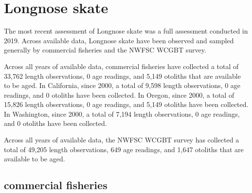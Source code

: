 \documentclass[11pt,
  english,
  letterpaper,
]{article}
\begin{document}

\hypertarget{longnose-skate}{%
\section{Longnose skate}\label{longnose-skate}}

\leavevmode\tagmcend\tagstructend


The most recent assessment of Longnose skate was a full assessment conducted in 2019. Across available data, Longnose skate have been observed and sampled generally by commercial fisheries and the NWFSC WCGBT survey.

\leavevmode\tagmcend\tagstructend\par


Across all years of available data, commercial fisheries have collected a total of 33,762 length observations, 0 age readings, and 5,149 otoliths that are available to be aged. In California, since 2000, a total of 9,598 length observations, 0 age readings, and 0 otoliths have been collected. In Oregon, since 2000, a total of 15,826 length observations, 0 age readings, and 5,149 otoliths have been collected. In Washington, since 2000, a total of 7,194 length observations, 0 age readings, and 0 otoliths have been collected.

\leavevmode\tagmcend\tagstructend\par


Across all years of available data, the NWFSC WCGBT survey has collected a total of 49,205 length observations, 649 age readings, and 1,647 otoliths that are available to be aged.

\leavevmode\tagmcend\tagstructend\par


\hypertarget{commercial-fisheries-29}{%
\subsection{commercial fisheries}\label{commercial-fisheries-29}}

\leavevmode\tagmcend\tagstructend

\end{document}
